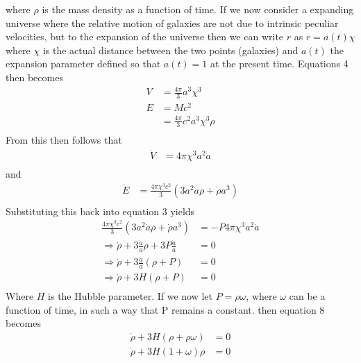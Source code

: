 \documentclass[a4paper, 11pt]{FSKH_623_Report}
\numberwithin{equation}{section}
\begin{document}
where $\rho$ is the mass density as a function of time.
If we now consider a expanding universe where the relative motion of galaxies are not due to intrinsic peculiar velocities, but to the expansion of the universe then we can write $r$ as $r=a(t)\chi$ where $\chi$ is the actual distance between the two points (galaxies) and $a(t)$ the expansion parameter defined so that $a(t)=1$ at the present time. Equations 4 then becomes
\begin{equation}
\begin{split}
V &= \frac{4\pi}{3}a^{3}\chi^{3}\\
E &= Mc^{2}\\
&=\frac{4\pi}{3}c^{2}a^{3}\chi^{3}\rho\\
\end{split}
\end{equation}
From this then follows that
\begin{equation}
\begin{split}
\dot{V} &= 4\pi\chi^{3}a^{2}\dot{a}\\
\end{split}
\end{equation}
and
\begin{equation}
\begin{split}
\dot{E} &= \frac{4\pi\chi^{3} c^{2}}{3}\left(3a^{2}\dot{a}\rho+\dot{\rho}a^{3}\right)\\
\end{split}
\end{equation}
Substituting this back into equation 3 yields
\begin{equation}
\begin{split}
\frac{4\pi\chi^{3} c^{2}}{3}\left(3a^{2}\dot{a}\rho+\dot{\rho}a^{3}\right) &= -P4\pi\chi^{3}a^{2}\dot{a}\\
\Rightarrow \dot{\rho}+3\frac{\dot{a}}{a}\rho+3P\frac{\dot{a}}{a} &= 0\\
\Rightarrow \dot{\rho}+3\frac{\dot{a}}{a}\left(\rho+P\right) &= 0\\
\Rightarrow \dot{\rho}+3H\left(\rho+P\right) &= 0\\
\end{split}
\end{equation}
Where $H$ is the Hubble parameter.
If we now let $P=\rho\omega$, where $\omega$ can be a function of time, in such a way that P remains a constant.
then equation 8 becomes
\begin{equation}
\begin{split}
\dot{\rho}+3H\left(\rho+\rho\omega\right) &= 0\\
\dot{\rho}+3H\left(1+\omega\right)\rho &= 0\\
\end{split}
\end{equation}
\end{document}
